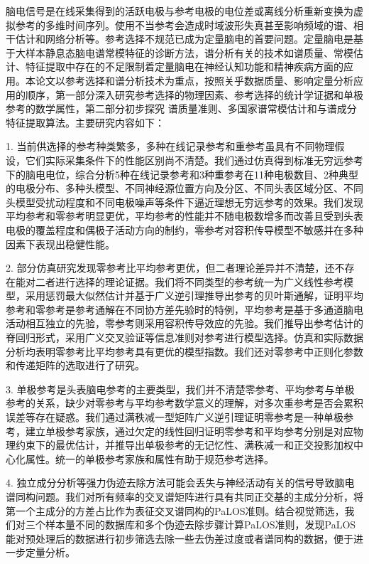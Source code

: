 \begin{chineseabstract}
脑电信号是在线采集得到的活跃电极与参考电极的电位差或离线分析重新变换为虚拟参考的多维时间序列。使用不当参考会造成时域波形失真甚至影响频域的谱、相干估计和网络分析等。参考选择不规范已成为定量脑电的首要问题。定量脑电是基于大样本静息态脑电谱常模特征的诊断方法，谱分析有关的技术如谱质量、常模估计、特征提取中存在的不足限制着定量脑电在神经认知功能和精神疾病方面的应用。本论文以参考选择和谱分析技术为重点，按照关乎数据质量、影响定量分析应用的顺序，第一部分深入研究参考选择的物理因素、参考选择的统计学证据和单极参考的数学属性，第二部分初步探究
谱质量准则、多国家谱常模估计和与谱成分特征提取算法。主要研究内容如下：

1. 当前供选择的参考种类繁多，多种在线记录参考和重参考虽具有不同物理假设，它们实际采集条件下的性能区别尚不清楚。我们通过仿真得到标准无穷远参考下的脑电电位，综合分析5种在线记录参考和3种重参考在11种电极数目、2种典型的电极分布、多种头模型、不同神经源位置方向及分区、不同头表区域分区、不同头模型受扰动程度和不同电极噪声等条件下逼近理想无穷远参考的效果。我们发现平均参考和零参考明显更优，平均参考的性能并不随电极数增多而改善且受到头表电极的覆盖程度和偶极子活动方向的制约，零参考对容积传导模型不敏感并在多种因素下表现出稳健性能。

2. 部分仿真研究发现零参考比平均参考更优，但二者理论差异并不清楚，还不存在能对二者进行选择的理论证据。我们将不同类型的参考统一为广义线性参考模型，采用惩罚最大似然估计并基于广义逆引理推导出参考的贝叶斯通解，证明平均参考和零参考是参考通解在不同协方差先验时的特例，平均参考是基于多通道脑电活动相互独立的先验，零参考则采用容积传导效应的先验。我们推导出参考估计的脊回归形式，采用广义交叉验证等信息准则对参考进行模型选择。仿真和实际数据分析均表明零参考比平均参考具有更优的模型指数。我们还对零参考中正则化参数和传递矩阵的选取进行了研究。

3. 单极参考是头表脑电参考的主要类型，我们并不清楚零参考、平均参考与单极参考的关系，缺少对零参考与平均参考数学意义的理解，对多次重参考是否会累积误差等存在疑惑。我们通过满秩减一型矩阵广义逆引理证明零参考是一种单极参考，建立单极参考家族，通过欠定的线性回归证明零参考和平均参考分别是对应物理约束下的最优估计，并推导出单极参考的无记忆性、满秩减一和正交投影加权中心化属性。统一的单极参考家族和属性有助于规范参考选择。

4. 独立成分分析等强力伪迹去除方法可能会丢失与神经活动有关的信号导致脑电谱同构问题。我们对所有频率的交叉谱矩阵进行具有共同正交基的主成分分析，将第一个主成分的方差占比作为表征交叉谱同构的PaLOS准则。结合视觉筛选，我们对三个样本量不同的数据库和多个伪迹去除步骤计算PaLOS准则，发现PaLOS能对预处理后的数据进行初步筛选去除一些去伪差过度或者谱同构的数据，便于进一步定量分析。


\end{chineseabstract}
